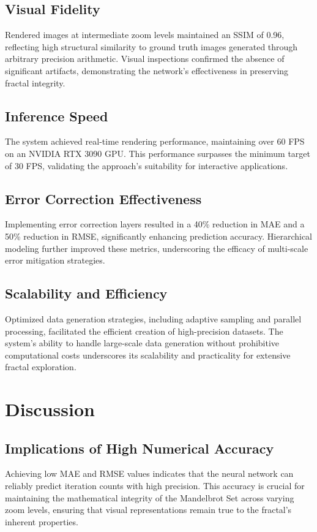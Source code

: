 \documentclass[journal]{IEEEaccess}
\begin{document}
\subsection{Visual Fidelity}
Rendered images at intermediate zoom levels maintained an SSIM of 0.96, reflecting high structural similarity to ground truth images generated through arbitrary precision arithmetic. Visual inspections confirmed the absence of significant artifacts, demonstrating the network's effectiveness in preserving fractal integrity.

\subsection{Inference Speed}
The system achieved real-time rendering performance, maintaining over 60 FPS on an NVIDIA RTX 3090 GPU. This performance surpasses the minimum target of 30 FPS, validating the approach's suitability for interactive applications.

\subsection{Error Correction Effectiveness}
Implementing error correction layers resulted in a 40\% reduction in MAE and a 50\% reduction in RMSE, significantly enhancing prediction accuracy. Hierarchical modeling further improved these metrics, underscoring the efficacy of multi-scale error mitigation strategies.

\subsection{Scalability and Efficiency}
Optimized data generation strategies, including adaptive sampling and parallel processing, facilitated the efficient creation of high-precision datasets. The system's ability to handle large-scale data generation without prohibitive computational costs underscores its scalability and practicality for extensive fractal exploration.

\section{Discussion}
\label{sec:discussion}
\subsection{Implications of High Numerical Accuracy}
Achieving low MAE and RMSE values indicates that the neural network can reliably predict iteration counts with high precision. This accuracy is crucial for maintaining the mathematical integrity of the Mandelbrot Set across varying zoom levels, ensuring that visual representations remain true to the fractal's inherent properties.
\end{document}
